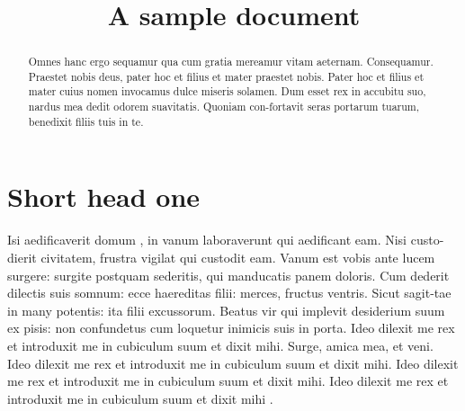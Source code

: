 \documentclass{infor}
\theoremstyle{remark}
\begin{document}
\begin{frontmatter}

\title{A sample document}

\author[a]{ }
\author[b]{ }
\address[a]{Address of the First author, , }
\address[b]{Address of the Second author, , }


\begin{abstract}
Omnes hanc ergo sequamur qua cum gratia mereamur vitam aeternam.
Consequamur. Praestet nobis deus, pater hoc et filius et mater
praestet nobis.  Pater hoc et filius et mater cuius nomen invocamus
dulce miseris solamen. Dum esset rex in accubitu suo, nardus mea
dedit odorem suavitatis. Quoniam con-fortavit seras portarum tuarum,
benedixit filiis tuis in te.
\end{abstract}

\begin{keyword}
\kwd{\LaTeX}
\end{keyword}

\end{frontmatter}

\section{Short head one}

Isi aedificaverit domum \citep{BLG09,BlanLedShi10}, in vanum
\cite*{XiuliChao1999} laboraverunt qui aedificant eam.
Nisi custo-dierit civitatem, frustra vigilat qui custodit eam. Vanum
est vobis ante lucem surgere: surgite postquam sederitis, qui
manducatis panem doloris. Cum dederit dilectis suis somnum: ecce
haereditas filii: merces, fructus ventris. Sicut sagit-tae in many
potentis: ita filii excussorum. Beatus vir qui implevit desiderium
suum ex pisis: non confundetus cum loquetur inimicis suis in porta.
Ideo dilexit me rex et introduxit me in cubiculum suum et dixit
mihi.
Surge, amica mea, et veni.
Ideo dilexit me rex et introduxit me in cubiculum suum et dixit
mihi.
Ideo dilexit me rex et introduxit me in cubiculum suum et dixit
mihi.
Ideo dilexit me rex et introduxit me in cubiculum suum et dixit
mihi \cite{powergrid1}.
\end{document}
